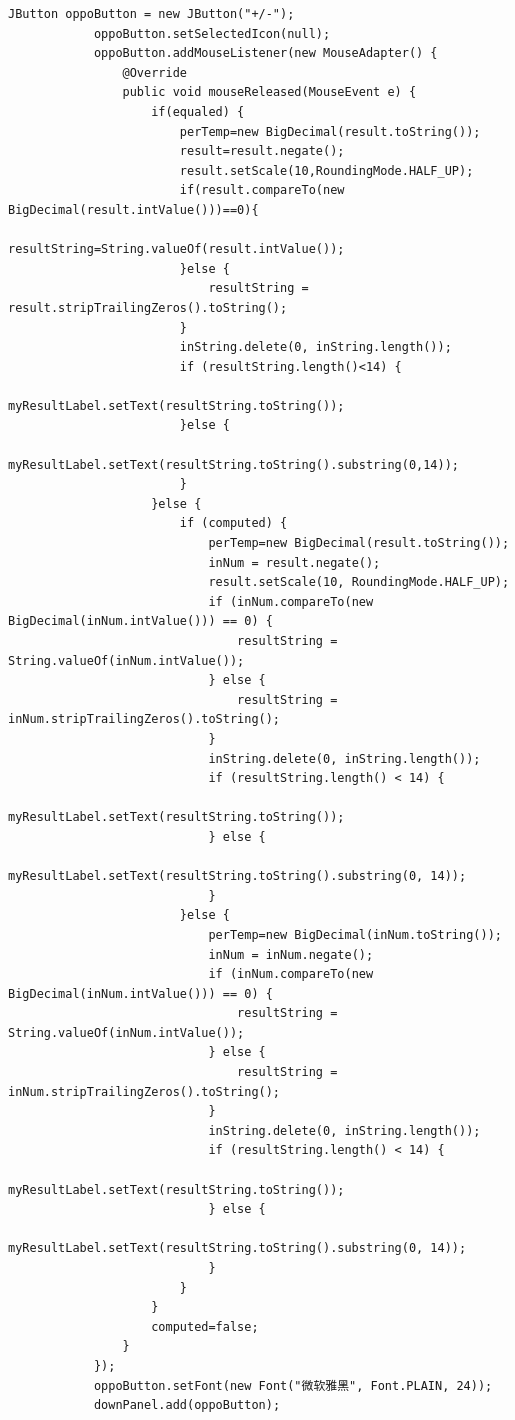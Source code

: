 \documentclass{ctexart}
\begin{document}
\begin{lstlisting}[caption=冗杂的代码]
            JButton oppoButton = new JButton("+/-");
            oppoButton.setSelectedIcon(null);
            oppoButton.addMouseListener(new MouseAdapter() {
                @Override
                public void mouseReleased(MouseEvent e) {
                    if(equaled) {
                        perTemp=new BigDecimal(result.toString());
                        result=result.negate();
                        result.setScale(10,RoundingMode.HALF_UP);
                        if(result.compareTo(new BigDecimal(result.intValue()))==0){
                            resultString=String.valueOf(result.intValue());
                        }else {
                            resultString = result.stripTrailingZeros().toString();
                        }
                        inString.delete(0, inString.length());
                        if (resultString.length()<14) {
                            myResultLabel.setText(resultString.toString());
                        }else {
                            myResultLabel.setText(resultString.toString().substring(0,14));
                        }
                    }else {
                        if (computed) {
                            perTemp=new BigDecimal(result.toString());
                            inNum = result.negate();
                            result.setScale(10, RoundingMode.HALF_UP);
                            if (inNum.compareTo(new BigDecimal(inNum.intValue())) == 0) {
                                resultString = String.valueOf(inNum.intValue());
                            } else {
                                resultString = inNum.stripTrailingZeros().toString();
                            }
                            inString.delete(0, inString.length());
                            if (resultString.length() < 14) {
                                myResultLabel.setText(resultString.toString());
                            } else {
                                myResultLabel.setText(resultString.toString().substring(0, 14));
                            } 
                        }else {
                            perTemp=new BigDecimal(inNum.toString());
                            inNum = inNum.negate();
                            if (inNum.compareTo(new BigDecimal(inNum.intValue())) == 0) {
                                resultString = String.valueOf(inNum.intValue());
                            } else {
                                resultString = inNum.stripTrailingZeros().toString();
                            }
                            inString.delete(0, inString.length());
                            if (resultString.length() < 14) {
                                myResultLabel.setText(resultString.toString());
                            } else {
                                myResultLabel.setText(resultString.toString().substring(0, 14));
                            }
                        }	
                    }	
                    computed=false;	
                }
            });
            oppoButton.setFont(new Font("微软雅黑", Font.PLAIN, 24));
            downPanel.add(oppoButton);
            

\end{lstlisting}
\end{document}
